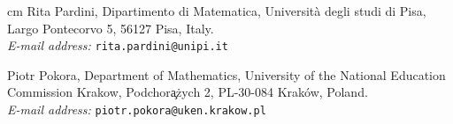 \documentclass[12pt]{amsart}
\theoremstyle{plain}
\theoremstyle{definition}
\begin{document}
 cm
Rita Pardini,
Dipartimento di Matematica, 
Universit\`a degli studi di Pisa, 
Largo Pontecorvo 5, 56127 Pisa, Italy. \\
\nopagebreak
\textit{E-mail address:} 
\texttt{rita.pardini@unipi.it}

\bigskip

Piotr Pokora,
Department of Mathematics,
University of the National Education Commission Krakow,
Podchor\c a\.zych 2,
PL-30-084 Krak\'ow, Poland. \\
\nopagebreak
\textit{E-mail address:} \texttt{piotr.pokora@uken.krakow.pl}
\bigskip
\end{document}
